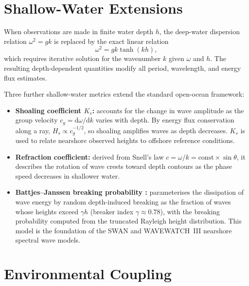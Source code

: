 \documentclass[journal]{IEEEtran}
\begin{document}
    \section{Shallow-Water Extensions}
    \label{sec:shallow}

    When observations are made in finite water depth $h$, the deep-water
    dispersion relation $\omega^2 = gk$ is replaced by the exact linear
    relation
    \begin{equation}
        \omega^2 = gk\tanh(kh),
        \label{eq:dispersion}
    \end{equation}
    which requires iterative solution for the wavenumber $k$ given $\omega$
    and $h$.
    The resulting depth-dependent quantities modify all period, wavelength,
    and energy flux estimates.

    Three further shallow-water metrics extend the standard open-ocean
    framework:
    \begin{itemize}
        \item \textbf{Shoaling coefficient $K_s$:} accounts for the change
        in wave amplitude as the group velocity $c_g = \mathrm{d}\omega/\mathrm{d}k$
        varies with depth.
        By energy flux conservation along a ray,
        $H_s \propto c_g^{-1/2}$, so shoaling amplifies waves as
        depth decreases.
        $K_s$ is used to relate nearshore observed heights to
        offshore reference conditions.
        \item \textbf{Refraction coefficient:} derived from Snell's law
        $c = \omega/k = \mathrm{const} \times \sin\theta$,
        it describes the rotation of wave crests toward depth
        contours as the phase speed decreases in shallower water.
        \item \textbf{Battjes--Janssen breaking probability
        \cite{Battjes1978}:} parameterises the dissipation of wave
        energy by random depth-induced breaking as the fraction of
        waves whose heights exceed $\gamma h$ (breaker index
        $\gamma \approx 0.78$), with the breaking probability
        computed from the truncated Rayleigh height distribution.
        This model is the foundation of the SWAN \cite{Booij1999}
        and WAVEWATCH~III \cite{Tolman2009} nearshore spectral
        wave models.
    \end{itemize}

    \section{Environmental Coupling}
    \label{sec:env}
\end{document}
